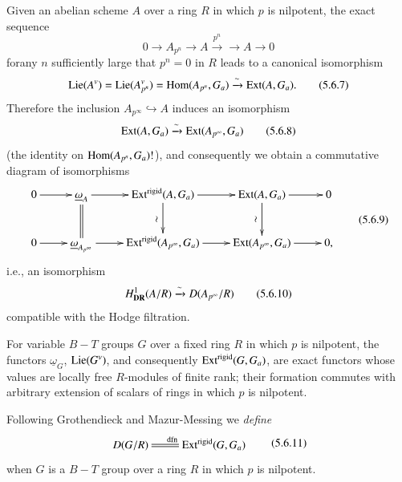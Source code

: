 Given an abelian scheme $A$ over a ring $R$ in which $p$ is nilpotent, the exact sequence
\begin{equation*}
0\to A_{p^{n}}\to A\xrightarrow{p^{n}}\to A\to 0\tag{5.6.6}\label{art6-eq5.6.6}
\end{equation*}
for\pageoriginale any $n$ sufficiently large that $p^{n}=0$ in $R$ leads to a canonical isomorphism
\begin{equation*}
\operatorname{Lie}(A^{v})=\operatorname{Lie}(A^{v}_{p^{n}})=\operatorname{Hom}(A_{p^{n}},G_{a})\xrightarrow{\sim}\operatorname{Ext}(A,G_{a}).\tag{5.6.7}\label{art6-eq5.6.7}
\end{equation*}
Therefore the inclusion $A_{p^{\infty}}\hookrightarrow A$ induces an isomorphism
\begin{equation*}
\operatorname{Ext}(A,G_{a})\xrightarrow{\sim}\operatorname{Ext}(A_{p^{\infty}},G_{a})\tag{5.6.8}\label{art6-eq5.6.8}
\end{equation*}
(the identity on $\operatorname{Hom}(A_{p^{n}},G_{a})!$), and consequently we obtain a commutative diagram of isomorphisms
\begin{equation*}
\vcenter{
\xymatrix{
0\ar[r] & \underline{\omega}_{A}\ar@{=}[d]\ar[r] & \Ext^{\text{rigid}}(A,G_{a})\ar[d]_{\rotatebox{90}{$\sim$}}\ar[r] & \Ext(A,G_{a})\ar[d]_{\rotatebox{90}{$\sim$}}\ar[r] & 0\\
0\ar[r] & \underline{\omega}_{A_{p^{\infty}}}\ar[r] & \Ext^{\text{rigid}}(A_{p^{\infty}},G_{a})\ar[r] & \Ext(A_{p^{\infty}},G_{a})\ar[r] & 0,
}}\tag{5.6.9}\label{art6-eq5.6.9}
\end{equation*}
i.e., an isomorphism
\begin{equation*}
H^{1}_{\mathbf{DR}}(A/R)\xrightarrow{\sim}D(A_{p^{\infty}}/R)\tag{5.6.10}\label{art6-eq5.6.10}
\end{equation*}
compatible with the Hodge filtration.

For variable $B-T$ groups $G$ over a fixed ring $R$ in which $p$ is nilpotent, the functors $\underline{\omega}_{G}$, $\operatorname{Lie}(G^{v})$, and consequently $\operatorname{Ext}^{\text{rigid}}(G,G_{a})$, are exact functors whose values are locally free $R$-modules of finite rank; their formation commutes with arbitrary extension of scalars of rings in which $p$ is nilpotent.

Following Grothendieck and Mazur-Messing we {\em define}
\begin{equation*}
\vcenter{
\xymatrix{
D(G/R)\ar@{=}[r]^{\text{dfn}} & \Ext^{\text{rigid}}(G,G_{a})
}}\tag{5.6.11}\label{art6-eq5.6.11}
\end{equation*}
when $G$ is a $B-T$ group over a ring $R$ in which $p$ is nilpotent.

